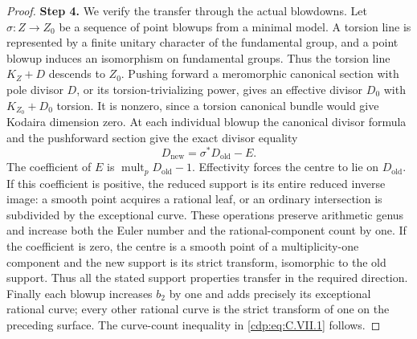 \begin{proof}
\noindent\textbf{Step 4.} We verify the transfer through the actual blowdowns.
Let $\sigma:Z\to Z_0$ be a sequence of point blowups
from a minimal model. A torsion line is represented by
a finite unitary character of the fundamental group,
and a point blowup induces an isomorphism on fundamental
groups. Thus the torsion line $K_Z+D$ descends to $Z_0$.
Pushing forward a meromorphic canonical section with pole
divisor $D$, or its torsion-trivializing power, gives an
effective divisor $D_0$ with $K_{Z_0}+D_0$ torsion.
It is nonzero, since a torsion canonical bundle would
give Kodaira dimension zero. At each individual blowup
the canonical divisor formula and the pushforward section
give the exact divisor equality
\[
 D_{\mathrm{new}}=\sigma^*D_{\mathrm{old}}-E.
\tag{C.VII.2}\label{cdp:eq:C.VII.2}
\]
The coefficient of $E$ is
$\operatorname{mult}_pD_{\mathrm{old}}-1$.
Effectivity forces the centre to lie on $D_{\mathrm{old}}$.
If this coefficient is positive, the reduced support
is its entire reduced inverse image: a smooth point
acquires a rational leaf, or an ordinary intersection
is subdivided by the exceptional curve. These operations
preserve arithmetic genus and increase both the Euler
number and the rational-component count by one.
If the coefficient is zero, the centre is a smooth point
of a multiplicity-one component and the new support is
its strict transform, isomorphic to the old support.
Thus all the stated support properties transfer in the
required direction. Finally each blowup increases $b_2$
by one and adds precisely its exceptional rational
curve; every other rational curve is the strict transform
of one on the preceding surface. The curve-count
inequality in \eqref{cdp:eq:C.VII.1} follows.
\end{proof}
